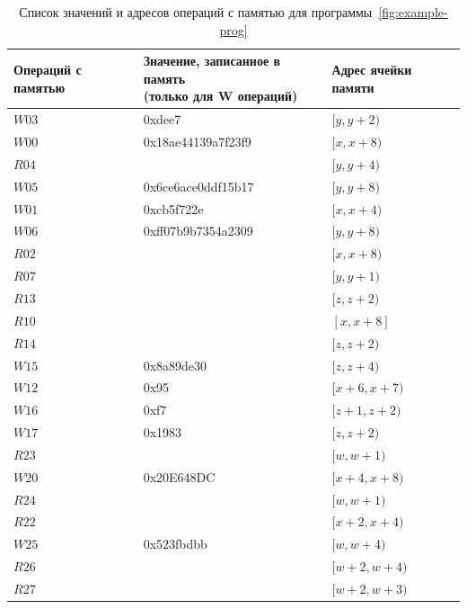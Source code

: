 \begin{table}[h]
  \centering
  \caption{Список значений и адресов операций с памятью для
  программы~\ref{fig:example-prog}}
  \small
  \begin{tabularx}{\textwidth}{@{}l X l@{}}
    \toprule
    Операций с памятью & \makecell[l]{Значение, записанное в
    память\\(только для W операций)} & Адрес ячейки памяти \\
    \midrule
    $W03$ & 0xdee7 & \([y, y+2)\) \\
    $W00$ & 0x18ae44139a7f23f9 & \([x, x+8)\) \\
    $R04$ &  & \([y, y+4)\) \\
    $W05$ & 0x6ce6ace0ddf15b17 & \([y, y+8)\) \\
    $W01$ & 0xcb5f722e & \([x, x+4)\) \\
    $W06$ & 0xff07b9b7354a2309 & \([y, y+8)\) \\
    $R02$ &  & \([x, x+8)\) \\
    $R07$ &  & \([y, y+1)\) \\
    $R13$ &  & \([z, z+2)\) \\
    $R10$ &  & \([x, x+8]\) \\
    $R14$ &  & \([z, z+2)\) \\
    $W15$ & 0x8a89de30 & \([z, z+4)\) \\
    $W12$ & 0x95 & \([x+6, x+7)\) \\
    $W16$ & 0xf7 & \([z+1, z+2)\) \\
    $W17$ & 0x1983 & \([z, z+2)\) \\
    $R23$ &  & \([w, w+1)\) \\
    $W20$ & 0x20E648DC & \([x+4, x+8)\) \\
    $R24$ &  & \([w, w+1)\) \\
    $R22$ &  & \([x+2, x+4)\) \\
    $W25$ & 0x523fbdbb & \([w, w+4)\) \\
    $R26$ &  & \([w+2, w+4)\) \\
    $R27$ &  & \([w+2, w+3)\) \\
    \bottomrule
  \end{tabularx}
  \label{tab:memory-access}
\end{table}
